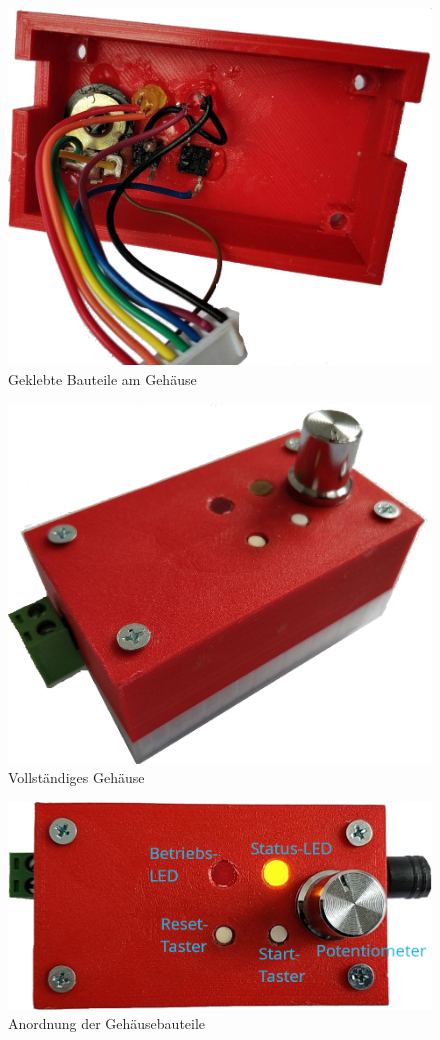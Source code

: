 \documentclass[a4paper, 12pt]{article}
\begin{document}
    \begin{figure}[H]
      \begin{center}
      \includegraphics[page=1, width=0.5\linewidth]{graphics/klebi.png}
      \caption{Geklebte Bauteile am Gehäuse}
      \label{fig:klebi}
      \end{center}
    \end{figure}

    \begin{figure}[H]
      \begin{center}
      \includegraphics[page=1, width=0.5\linewidth]{graphics/gehaeuse.png}
      \caption{Vollständiges Gehäuse}
      \label{fig:gehaeuse}
      \end{center}
    \end{figure}

    \begin{figure}[H]
      \begin{center}
      \includegraphics[page=1, width=0.5\linewidth]{graphics/gehaeuse_bezeichnung.png}
      \caption{Anordnung der Gehäusebauteile}
      \label{fig:erklaer}
      \end{center}
    \end{figure}
\end{document}

